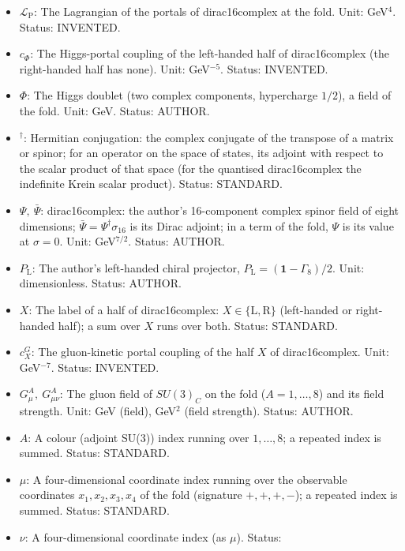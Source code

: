 \documentclass[
  10pt,
]{article}
\providecommand{\tightlist}{%
  \setlength{\itemsep}{0pt}\setlength{\parskip}{0pt}}
\begin{document}
\begin{itemize}
\tightlist
\item
  \(\mathcal{L}_{\mathrm{P}}\): The Lagrangian of the portals of
  dirac16complex at the fold. Unit: GeV\(^4\). Status: INVENTED.
\item
  \(c_\Phi\): The Higgs-portal coupling of the left-handed half of
  dirac16complex (the right-handed half has none). Unit: GeV\(^{-5}\).
  Status: INVENTED.
\item
  \(\Phi\): The Higgs doublet (two complex components, hypercharge
  \(1/2\)), a field of the fold. Unit: GeV. Status: AUTHOR.
\item
  \({}^\dagger\): Hermitian conjugation: the complex conjugate of the
  transpose of a matrix or spinor; for an operator on the space of
  states, its adjoint with respect to the scalar product of that space
  (for the quantised dirac16complex the indefinite Krein scalar
  product). Status: STANDARD.
\item
  \(\Psi,\ \bar\Psi\): dirac16complex: the author's 16-component complex
  spinor field of eight dimensions;
  \(\bar\Psi = \Psi^\dagger\sigma_{16}\) is its Dirac adjoint; in a term
  of the fold, \(\Psi\) is its value at \(\sigma = 0\). Unit:
  GeV\(^{7/2}\). Status: AUTHOR.
\item
  \(P_{\mathrm{L}}\): The author's left-handed chiral projector,
  \(P_{\mathrm{L}} = (\mathbf{1} - \Gamma_8)/2\). Unit: dimensionless.
  Status: AUTHOR.
\item
  \(X\): The label of a half of dirac16complex:
  \(X \in \{\mathrm{L}, \mathrm{R}\}\) (left-handed or right-handed
  half); a sum over \(X\) runs over both. Status: STANDARD.
\item
  \(c^{G}_X\): The gluon-kinetic portal coupling of the half \(X\) of
  dirac16complex. Unit: GeV\(^{-7}\). Status: INVENTED.
\item
  \(G^A_\mu,\ G^A_{\mu\nu}\): The gluon field of \(SU(3)_C\) on the fold
  (\(A = 1, \dots, 8\)) and its field strength. Unit: GeV (field),
  GeV\(^2\) (field strength). Status: AUTHOR.
\item
  \(A\): A colour (adjoint SU(3)) index running over \(1, \dots, 8\); a
  repeated index is summed. Status: STANDARD.
\item
  \(\mu\): A four-dimensional coordinate index running over the
  observable coordinates \(x_1, x_2, x_3, x_4\) of the fold (signature
  \(+,+,+,-\)); a repeated index is summed. Status: STANDARD.
\item
  \(\nu\): A four-dimensional coordinate index (as \(\mu\)). Status:

\end{itemize}
\end{document}

